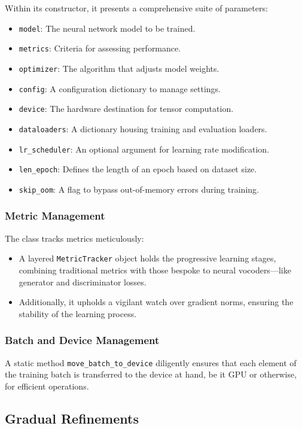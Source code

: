 \documentclass[a4paper]{article}
\begin{document}
Within its constructor, it presents a comprehensive suite of parameters:
\begin{itemize}
  \item \texttt{model}: The neural network model to be trained.
  \item \texttt{metrics}: Criteria for assessing performance.
  \item \texttt{optimizer}: The algorithm that adjusts model weights.
  \item \texttt{config}: A configuration dictionary to manage settings.
  \item \texttt{device}: The hardware destination for tensor computation.
  \item \texttt{dataloaders}: A dictionary housing training and evaluation loaders.
  \item \texttt{lr\_scheduler}: An optional argument for learning rate modification.
  \item \texttt{len\_epoch}: Defines the length of an epoch based on dataset size.
  \item \texttt{skip\_oom}: A flag to bypass out-of-memory errors during training.
\end{itemize}

\subsubsection{Metric Management}

The class tracks metrics meticulously:
\begin{itemize}
  \item A layered \texttt{MetricTracker} object holds the progressive learning stages, combining traditional metrics with those bespoke to neural vocoders—like generator and discriminator losses.
  \item Additionally, it upholds a vigilant watch over gradient norms, ensuring the stability of the learning process.
\end{itemize}

\subsubsection{Batch and Device Management}

A static method \texttt{move\_batch\_to\_device} diligently ensures that each element of the training batch is transferred to the device at hand, be it GPU or otherwise, for efficient operations.

\subsection{Gradual Refinements}
\end{document}
